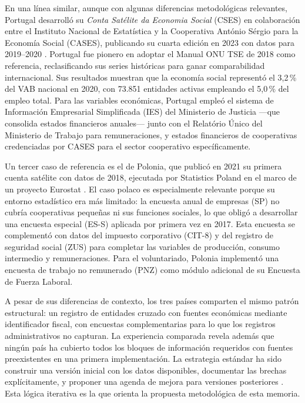 En una línea similar, aunque con algunas diferencias metodológicas relevantes,
Portugal desarrolló su \textit{Conta Satélite da Economia Social} (CSES) en
colaboración entre el Instituto Nacional de Estatística y la Cooperativa António
Sérgio para la Economía Social (CASES), publicando su cuarta edición en 2023 con
datos para 2019--2020 . Portugal fue pionero en adoptar el
Manual ONU TSE de 2018 como referencia, reclasificando sus series históricas para
ganar comparabilidad internacional. Sus resultados muestran que la economía social
representó el 3{,}2\,\% del VAB nacional en 2020, con 73.851 entidades activas
empleando el 5{,}0\,\% del empleo total. Para las variables económicas, Portugal
empleó el sistema de Información Empresarial Simplificada (IES) del Ministerio de
Justicia ---que consolida estados financieros anuales--- junto con el Relatório Único
del Ministerio de Trabajo para remuneraciones, y estados financieros de cooperativas
credenciadas por CASES para el sector cooperativo específicamente.

Un tercer caso de referencia es el de Polonia, que publicó en 2021 su primera cuenta
satélite con datos de 2018, ejecutada por Statistics Poland en el marco de un proyecto
Eurostat \cite{statistics_poland_social_2021}. El caso polaco es especialmente
relevante porque su entorno estadístico era más limitado: la encuesta anual de
empresas (SP) no cubría cooperativas pequeñas ni sus funciones sociales, lo que obligó
a desarrollar una encuesta especial (ES-S) aplicada por primera vez en 2017. Esta
encuesta se complementó con datos del impuesto corporativo (CIT-8) y del registro de
seguridad social (ZUS) para completar las variables de producción, consumo intermedio
y remuneraciones. Para el voluntariado, Polonia implementó una encuesta de trabajo no
remunerado (PNZ) como módulo adicional de su Encuesta de Fuerza Laboral.

A pesar de sus diferencias de contexto, los tres países comparten el mismo patrón
estructural: un registro de entidades cruzado con fuentes económicas mediante
identificador fiscal, con encuestas complementarias para lo que los registros
administrativos no capturan. La experiencia comparada revela además que ningún país
ha cubierto todos los bloques de información requeridos con fuentes preexistentes en
una primera implementación. La estrategia estándar ha sido construir una versión
inicial con los datos disponibles, documentar las brechas explícitamente, y proponer
una agenda de mejora para versiones posteriores \cite{archambault_lester_2022}. Esta
lógica iterativa es la que orienta la propuesta metodológica de esta memoria.

